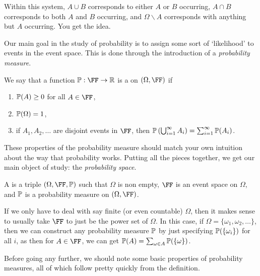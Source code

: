 \documentclass[a4paper]{scrartcl}
\begin{document}
Within this system, $A \cup B$ corresponds to either $A$ or $B$ occurring, $A \cap B$ corresponds to both $A$ and $B$ occurring, and $\Omega \backslash A$ corresponds with anything but $A$ occurring. You get the idea.

Our main goal in the study of probability is to assign some sort of `likelihood' to events in the event space. This is done through the introduction of a \emph{probability measure}.


\begin{definition}
	We say that a function $\PP : \FF \rightarrow \R$ is a  on $(\Omega, \FF)$ if
	\begin{enumerate}
		\item $\mathbb{P}(A) \geq 0$ for all $A \in \FF$,
		\item $\mathbb{P}(\Omega) = 1$,
		\item if $A_1, A_2, \dots$ are disjoint events in $\FF$, then $\mathbb{P}\left(\bigcup_{i = 1}^{\infty} A_i\right) = \sum_{i = 1}^{\infty} \mathbb{P}(A_i)$.
	\end{enumerate} 
\end{definition}

These properties of the probability measure should match your own intuition about the way that probability works. Putting all the pieces together, we get our main object of study: the \emph{probability space}.

\begin{definition}
	A  is a triple $(\Omega, \FF, \PP)$ such that $\Omega$ is non empty, $\FF$ is an event space on $\Omega$, and $\mathbb{P}$ is a probability measure on $(\Omega, \FF)$.
\end{definition}


If we only have to deal with say finite (or even countable) $\Omega$, then it makes sense to usually take $\FF$ to just be the power set of $\Omega$. In this case, if $\Omega = \{\omega_1, \omega_2, \dots \}$, then we can construct any probability measure $\mathbb{P}$ by just specifying $\mathbb{P}(\{\omega_i\})$ for all $i$, as then for $A \in \FF$, we can get $\mathbb{P}(A) = \sum_{\omega \in A} \mathbb{P}(\{\omega\})$.

Before going any further, we should note some basic properties of probability measures, all of which follow pretty quickly from the definition.
\end{document}
